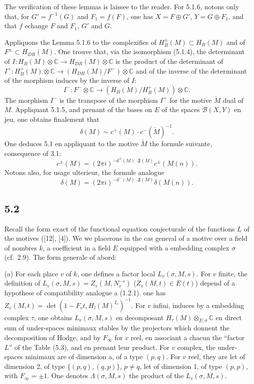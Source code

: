 \documentclass[12pt,a4paper]{article}
\theoremstyle{plain}
\theoremstyle{definition}
\theoremstyle{remark}
\newcommand{\C}{\mathbb{C}}
\begin{document}
The verification of these lemmas is laissee to the reader. For 5.1.6, notons only
that, for $G' = f^{-1}(G)$ and $F_1 = f(F)$, one has $X = F \oplus G'$, $Y = G \oplus F_1$, and that $f$
echange $F$ and $F_1$, $G'$ and $G$.

Appliquons the Lemma 5.1.6 to the complexifies of $H^\pm_B(M) \subset H_B(M)$ and of
$F^\pm \subset H_{DR}(M)$. One trouve that, via the isomorphism (5.1.4), the determinant of
$I: H_B(M) \otimes \C \to H_{DR}(M) \otimes \C$ is the product of the determinant of
$I^+: H^+_B(M) \otimes \C \to (H_{DR}(M)/F^-) \otimes \C$ and of the inverse of the determinant of the morphism
induces by the inverse of $I$:
\[
I^-: F^- \otimes \C \to (H_B(M)/H^+_B(M)) \otimes \C.
\]
The morphism $I^-$ is the transpose of the morphism $I^+$ for the motive $\check{M}$ dual of $M$.
Appliquant 5.1.5, and prenant of the bases on $E$ of the spaces $\mathcal{B}(X, Y)$ en jeu, one obtains
finalement that
\begin{equation}\label{eq:5.1.7}
\delta(M) \sim c^+(M) \cdot c^-({\check{M}})^{-1}.
\end{equation}
One deduces 5.1 en appliquant to the motive $\check{M}$ the formule suivante, consequence
of 3.1:
\begin{equation}\label{eq:5.1.8}
c^\pm(M) = (2\pi i)^{-d^\mp(M) \cdot \mathfrak{F}(M)} c^\pm(M(n)).
\end{equation}
Notons also, for usage ulterieur, the formule analogue
\begin{equation}\label{eq:5.1.9}
\delta(M) = (2\pi i)^{-d^-(M) \cdot \mathfrak{F}(M)} \delta(M(n)).
\end{equation}

\subsection*{5.2}

Recall the form exact of the functional equation conjecturale of the functions
$L$ of the motives ([12], [4]). We we placerons in the cas general of a motive over a field of nombres $k$, a coefficient in a field $E$ equipped with a embedding complex
$\sigma$ (cf.~2.9). The form generale of abord:

(a) For each place $v$ of $k$, one defines a factor local $L_v(\sigma, M, s)$. For $v$ finite,
the definition of $L_v(\sigma, M, s) = Z_v(M, N_v^{-s})$ ($Z_v(M, t) \in E(t)$) depend of a hypothese
of compatibility analogue a (1.2.1). one has $Z_v(M, t) = \det(1 - F_v t, H_l(M)^{I_v})^{-1}$.
For $v$ infini, induces by a embedding complex $\tau$, one obtains $L_v(\sigma, M, s)$ en
decomposant $H_\tau(M) \otimes_{E,\sigma} \C$ en direct sum of under-spaces minimaux stables by
the projectors which donnent the decomposition of Hodge, and by $F_\infty$ for $v$ reel, en
associant a chacun the ``factor $L$'' of the Table (5.3), and en prenant leur product. For
$v$ complex, the under-spaces minimaux are of dimension a, of a type $(p, q)$.
For $v$ reel, they are let of dimension 2, of type $\{(p,q), (q,p)\}$, $p \neq q$, let of dimension 1, of type $(p,p)$, with $F_\infty = \pm 1$. One denotes $\Lambda(\sigma, M, s)$ the product of the
$L_v(\sigma, M, s)$.
\end{document}
